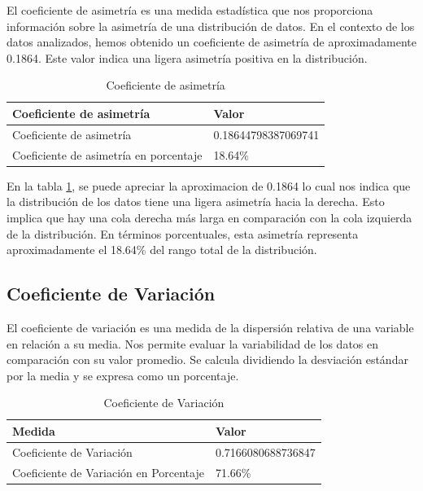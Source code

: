 El coeficiente de asimetría es una medida estadística que nos proporciona
información sobre la asimetría de una distribución de datos. En el contexto de
los datos analizados, hemos obtenido un coeficiente de asimetría de
aproximadamente 0.1864. Este valor indica una ligera asimetría positiva en la
distribución.

\begin{table}[htbp]
    \centering
    \caption{Coeficiente de asimetría}
    \begin{tabular}{ll}
        \hline
        \textbf{Coeficiente de asimetría}      & \textbf{Valor}      \\
        \hline
        Coeficiente de asimetría               & 0.18644798387069741 \\
        Coeficiente de asimetría en porcentaje & 18.64\%             \\
        \hline
    \end{tabular}%
    \label{tab:skewness}%
\end{table}%

En la tabla \ref{tab:skewness}, se puede apreciar la aproximacion de 0.1864 lo
cual nos indica que la distribución de los datos tiene una ligera asimetría
hacia la derecha. Esto implica que hay una cola derecha más larga en
comparación con la cola izquierda de la distribución. En términos porcentuales,
esta asimetría representa aproximadamente el 18.64\% del rango total de la
distribución.

\subsection{Coeficiente de Variación}

El coeficiente de variación es una medida de la dispersión relativa de una
variable en relación a su media. Nos permite evaluar la variabilidad de los
datos en comparación con su valor promedio. Se calcula dividiendo la desviación
estándar por la media y se expresa como un porcentaje.

\begin{table}[htbp]
    \centering
    \caption{Coeficiente de Variación}
    \begin{tabular}{ll}
        \hline
        \textbf{Medida}                        & \textbf{Valor}     \\
        \hline
        Coeficiente de Variación               & 0.7166080688736847 \\
        \hline
        Coeficiente de Variación en Porcentaje & 71.66\%            \\
        \hline
    \end{tabular}
    \label{tab:coef_variacion}
\end{table}

